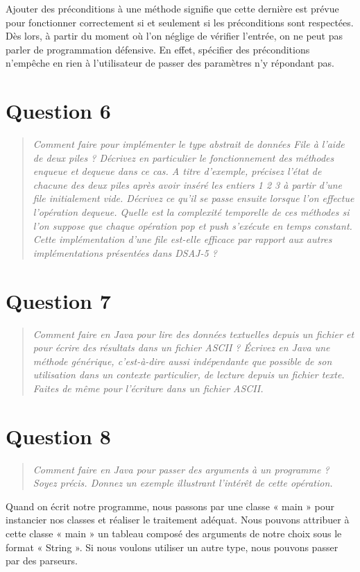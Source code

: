 \documentclass[11pt,a4paper]{article}
\begin{document}
Ajouter des préconditions à une méthode signifie que cette dernière est prévue pour fonctionner correctement si et seulement si les préconditions sont respectées. Dès lors, à partir du moment où l'on néglige de vérifier l'entrée, on ne peut pas parler de programmation défensive. En effet, spécifier des préconditions n'empêche en rien à l'utilisateur de passer des paramètres n'y répondant pas.

\section{Question 6}
\begin{quotation}
\textit{Comment faire pour implémenter le type abstrait de données File à l’aide de
deux piles ? Décrivez en particulier le fonctionnement des méthodes enqueue et
dequeue dans ce cas. A titre d’exemple, précisez l’état de chacune des deux piles
après avoir inséré les entiers 1 2 3 à partir d’une file initialement vide. Décrivez
ce qu’il se passe ensuite lorsque l’on effectue l’opération dequeue. Quelle est
la complexité temporelle de ces méthodes si l’on suppose que chaque opération
pop et push s’exécute en temps constant. Cette implémentation d’une file est-elle efficace par rapport aux autres implémentations présentées dans DSAJ-5 ?}
\end{quotation}

\section{Question 7}
\begin{quotation}
\textit{Comment faire en Java pour lire des données textuelles depuis un fichier et pour
écrire des résultats dans un fichier ASCII ? Écrivez en Java une méthode générique,
c’est-à-dire aussi indépendante que possible de son utilisation dans un contexte
particulier, de lecture depuis un fichier texte. Faites de même pour l’écriture dans
un fichier ASCII.}
\end{quotation}


\section{Question 8}
\begin{quotation}
\textit{Comment faire en Java pour passer des arguments à un programme ? Soyez précis.
Donnez un exemple illustrant l’intérêt de cette opération.}
\end{quotation}
Quand on écrit notre programme, nous passons par une classe « main » pour instancier nos classes et réaliser le traitement adéquat. Nous pouvons attribuer à cette classe « main » un tableau composé des arguments de notre choix sous le format « String ». Si nous voulons utiliser un autre type, nous pouvons passer par des parseurs.
\end{document}
